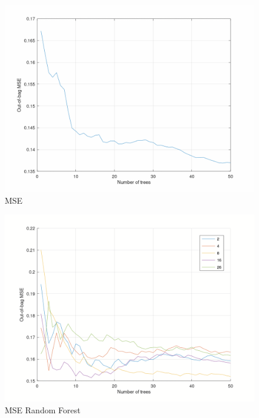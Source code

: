 \documentclass{article}
\begin{document}
\begin{figure}[H]
	\includegraphics[width=\textwidth,height=\textheight,keepaspectratio]{mse.png}
	\caption{MSE}
	\label{fig:MSE-general}
\end{figure}

\begin{figure}[H]
	\includegraphics[width=\textwidth,height=\textheight,keepaspectratio]{mse_rf.png}
	\caption{MSE Random Forest}
	\label{fig:MSE}
\end{figure}
\end{document}
